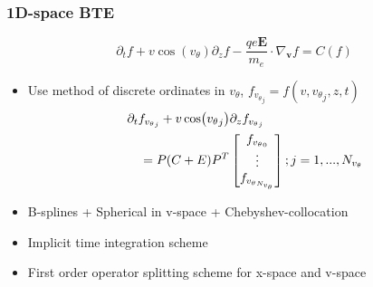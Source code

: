 \documentclass[mathserif, aspectratio=169]{beamer}
\newcommand{\vect}[1]{\boldsymbol{#1}}
\newcommand{\of}[1]{\mleft( #1 \mright)}
\newcommand{\vtheta}{{v_{\theta}}}
\begin{document}
\begin{frame}
	\frametitle{1D-space BTE}
	\begin{equation}
		\partial_t f + v\cos(\vtheta) \partial_z f -\frac{qe \vect{E}}{m_e} \cdot \nabla_{\vect{v}} f = C(f)
	\end{equation}
	\begin{itemize}
	\item Use method of discrete ordinates in $\vtheta$, $f_{\vtheta_j} = f(v, \vtheta_j, z, t)$
	\begin{align}
	\tiny
	&\partial_t f_{\vtheta_j} + v\cos\of{\vtheta_j} \partial_z f_{\vtheta_j} \nonumber \\
	&\quad = P (C + E) P^{T}\begin{bmatrix}
	f_{\vtheta_0}\\
	\vdots\\
	f_{\vtheta_{N_\vtheta}}\\
	\end{bmatrix} ; j=1,..., N_{\vtheta}	\label{eq:bte_discreate}
	\end{align}
	\item B-splines + Spherical in v-space +  Chebyshev-collocation %
	\item Implicit time integration scheme
	\item First order operator splitting scheme for x-space and v-space
	\end{itemize}
\end{frame}
\end{document}
